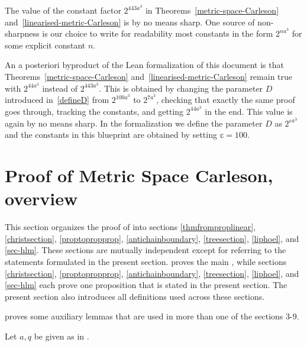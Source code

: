 \begin{remark}
The value of the constant factor $2^{443a^3}$ in Theorems~\ref{metric-space-Carleson}
and~\ref{linearised-metric-Carleson} is by no means sharp.
One source of non-sharpness is our choice to write for readability most constants in the form $2^{na^3}$ for some explicit constant $n$.

An a posteriori byproduct of the Lean formalization of this document is that Theorems~\ref{metric-space-Carleson}
and~\ref{linearised-metric-Carleson} remain true with $2^{44a^3}$ instead of $2^{443a^3}$. This is obtained by
changing the parameter $D$ introduced in~\eqref{defineD} from $2^{100a^3}$ to $2^{7a^3}$, checking that exactly the same
proof goes through, tracking the constants, and getting $2^{44a^3}$ in the end. This value is again by no means sharp.
In the formalization we define the parameter $D$ as $2^{\mathbb{c}a^3}$
and the constants in this blueprint are obtained by setting $\mathbb{c} = 100$.
\end{remark}

\section{Proof of Metric Space Carleson, overview}
\label{overviewsection}

This section organizes the proof of  into sections \ref{thmfromproplinear}, \ref{christsection}, \ref{proptopropprop}, \ref{antichainboundary}, \ref{treesection}, \ref{liphoel}, and \ref{sec-hlm}. These sections are mutually independent except for referring to the statements formulated in the present section.  proves the main , while sections \ref{christsection}, \ref{proptopropprop}, \ref{antichainboundary}, \ref{treesection}, \ref{liphoel}, and \ref{sec-hlm} each prove one proposition that is stated in the present section. The present section also introduces all definitions used across these sections.

 proves some auxiliary lemmas that are used in more than one of the sections 3-9.

Let $a, q$ be given as in .




